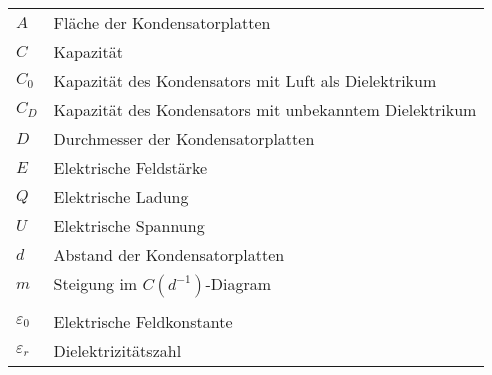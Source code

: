 \begin{table}[h]
    \begin{tabular}{@{}ll@{}}
        $A$ & Fläche der Kondensatorplatten\\
        $C$ & Kapazität\\
        $C_0$ & Kapazität des Kondensators mit Luft als Dielektrikum\\
        $C_D$ & Kapazität des Kondensators mit unbekanntem Dielektrikum\\
        $D$ & Durchmesser der Kondensatorplatten\\
        $E$ & Elektrische Feldstärke\\
        $Q$ & Elektrische Ladung \\
        $U$ & Elektrische Spannung\\
        $d$ & Abstand der Kondensatorplatten\\
        $m$ & Steigung im \(C(d^{-1})\)-Diagram\\
        & \\
        $\varepsilon_0$ & Elektrische Feldkonstante\\
        $\varepsilon_r$ & Dielektrizitätszahl\\
    \end{tabular}
    \label{tab:glossar}
\end{table}